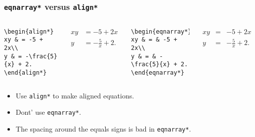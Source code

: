 \begin{frame}[fragile]
\frametitle{\texttt{eqnarray*} versus \texttt{align*}}
\begin{columns}[t]
\begin{verbatim}
\begin{align*}
xy & = -5 + 2x\\
y & = -\frac{5}{x} + 2.
\end{align*}
\end{verbatim}
\begin{example}[GOOD]
\abovedisplayskip=0pt
\begin{align*}
xy & = -5 + 2x\\
y & = -\frac{5}{x} + 2.
\end{align*}
\end{example}
\begin{verbatim}
\begin{eqnarray*}
xy & = & -5 + 2x\\
y & = & -\frac{5}{x} + 2.
\end{eqnarray*}
\end{verbatim}
\begin{example}[BAD]
\abovedisplayskip=0pt
\begin{eqnarray*}
xy & = & -5 + 2x\\
y & = & -\frac{5}{x} + 2.
\end{eqnarray*}
\end{example}
\end{columns}
\begin{itemize}
\item  Use \texttt{align*} to make aligned equations.
\item  Dont' use \texttt{eqnarray*}.  
\item  The spacing around the equals signs is bad in \texttt{eqnarray*}.
\end{itemize}
\end{frame}

